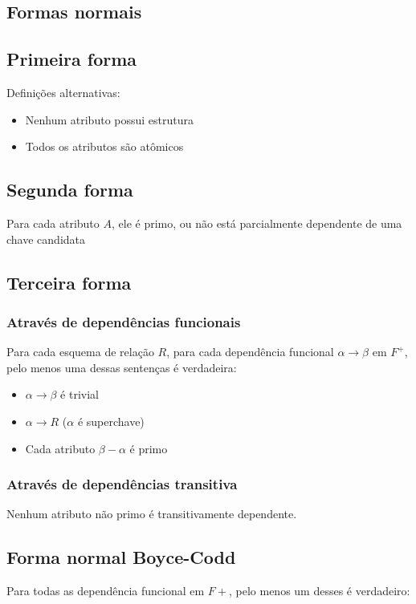 \newpage
\begin{tcolorbox}[sharp corners, colback=white,boxrule=1mm]
	\section{Formas normais}
	\subsection{Primeira forma}
	Definições alternativas:
	\begin{itemize}
		\item Nenhum atributo possui estrutura
		\item Todos os atributos são atômicos
	\end{itemize}
	
	\subsection{Segunda forma}
	Para cada atributo $A$, ele é primo, ou não está parcialmente dependente de uma chave candidata
	
	\subsection{Terceira forma}
	\subsubsection{Através de dependências funcionais}
	Para cada esquema de relação $R$, para cada dependência funcional $\alpha \to \beta$ em $F^+$, pelo menos uma dessas sentenças é verdadeira:
	
	\begin{itemize}
		\item $\alpha \to \beta$ é trivial 
		\item $\alpha \to R$ ($\alpha$ é superchave)
		\item Cada atributo $\beta - \alpha$ é primo
	\end{itemize}
	
	\subsubsection{Através de dependências transitiva}
	Nenhum atributo não primo é transitivamente dependente.
	
	\subsection{Forma normal Boyce-Codd}
	Para todas as dependência funcional em $F+$, pelo menos um desses é verdadeiro:
	

\end{tcolorbox}
